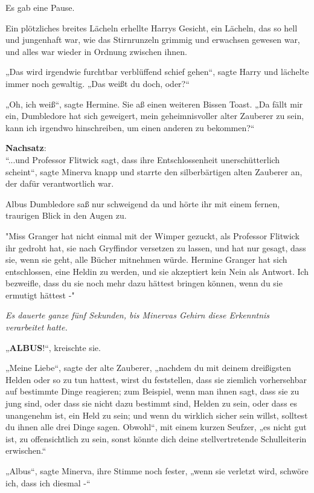 {Es gab eine Pause.

Ein plötzliches breites Lächeln erhellte Harrys Gesicht, ein Lächeln, das so hell und jungenhaft war, wie das Stirnrunzeln grimmig und erwachsen gewesen war, und alles war wieder in Ordnung zwischen ihnen.

„Das wird irgendwie furchtbar verblüffend schief gehen“, sagte Harry und lächelte immer noch gewaltig. „Das weißt du doch, oder?“

„Oh, ich weiß“, sagte Hermine. Sie aß einen weiteren Bissen Toast. „Da fällt mir ein, Dumbledore hat sich geweigert, mein geheimnisvoller alter Zauberer zu sein, kann ich irgendwo hinschreiben, um einen anderen zu bekommen?“

\textbf{Nachsatz}:\\ “...und Professor Flitwick sagt, dass ihre Entschlossenheit unerschütterlich scheint“, sagte Minerva knapp und starrte den silberbärtigen alten Zauberer an, der dafür verantwortlich war.

Albus Dumbledore saß nur schweigend da und hörte ihr mit einem fernen, traurigen Blick in den Augen zu.

"Miss Granger hat nicht einmal mit der Wimper gezuckt, als Professor Flitwick ihr gedroht hat, sie nach Gryffindor versetzen zu lassen, und hat nur gesagt, dass sie, wenn sie geht, alle Bücher mitnehmen würde. Hermine Granger hat sich entschlossen, eine Heldin zu werden, und sie akzeptiert kein Nein als Antwort. Ich bezweifle, dass du sie noch mehr dazu hättest bringen können, wenn du sie ermutigt hättest -"

\emph{Es dauerte ganze fünf Sekunden, bis Minervas Gehirn diese Erkenntnis verarbeitet hatte.}

„\textbf{ALBUS}!“, kreischte sie.

„Meine Liebe“, sagte der alte Zauberer, „nachdem du mit deinem dreißigsten Helden oder so zu tun hattest, wirst du feststellen, dass sie ziemlich vorhersehbar auf bestimmte Dinge reagieren; zum Beispiel, wenn man ihnen sagt, dass sie zu jung sind, oder dass sie nicht dazu bestimmt sind, Helden zu sein, oder dass es unangenehm ist, ein Held zu sein; und wenn du wirklich sicher sein willst, solltest du ihnen alle drei Dinge sagen. Obwohl“, mit einem kurzen Seufzer, „es nicht gut ist, zu offensichtlich zu sein, sonst könnte dich deine stellvertretende Schulleiterin erwischen.“

„Albus“, sagte Minerva, ihre Stimme noch fester, „wenn sie verletzt wird, schwöre ich, dass ich diesmal -“

}
